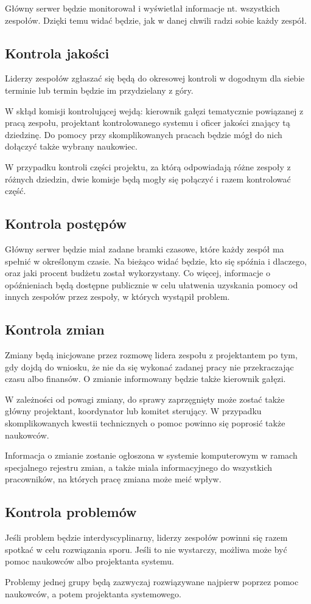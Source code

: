 Główny serwer będzie monitorował i wyświetlał informacje nt. wszystkich zespołów.
Dzięki temu widać będzie, jak w danej chwili radzi sobie każdy zespół.

\subsection{Kontrola jakości}
Liderzy zespołów zgłaszać się będą do okresowej kontroli w dogodnym dla siebie terminie lub termin będzie im przydzielany z góry.

W skłąd komisji kontrolującej wejdą: kierownik gałęzi tematycznie powiązanej z pracą zespołu, projektant kontrolowanego systemu i oficer jakości znający tą dziedzinę.
Do pomocy przy skomplikowanych pracach będzie mógł do nich dołączyć także wybrany naukowiec.

W przypadku kontroli części projektu, za którą odpowiadają różne zespoły z różnych dziedzin, dwie komisje będą mogły się połączyć i razem kontrolować część.

\subsection{Kontrola postępów}
Główny serwer będzie miał zadane bramki czasowe, które każdy zespół ma spełnić w określonym czasie. Na bieżąco widać będzie, kto się spóźnia i dlaczego, oraz jaki procent budżetu został wykorzystany.
Co więcej, informacje o opóźnieniach będą dostępne publicznie w celu ułatwenia uzyskania pomocy od innych zespołów przez zespoły, w których wystąpił problem.

\subsection{Kontrola zmian}
Zmiany będą inicjowane przez rozmowę lidera zespołu z projektantem po tym, gdy dojdą do wniosku, że nie da się wykonać zadanej pracy nie przekraczając czasu albo finansów.
O zmianie informowany będzie także kierownik gałęzi.

W zależności od powagi zmiany, do sprawy zaprzęgnięty może zostać także główny projektant, koordynator lub komitet sterujący.
W przypadku skomplikowanych kwestii technicznych o pomoc powinno się poprosić także naukowców.

Informacja o zmianie zostanie ogłoszona w systemie komputerowym w ramach specjalnego rejestru zmian, a także miala informacyjnego do wszystkich pracowników, na których pracę zmiana może meić wpływ.

\subsection{Kontrola problemów}
Jeśli problem będzie interdyscyplinarny, liderzy zespołów powinni się razem spotkać w celu rozwiązania sporu.
Jeśli to nie wystarczy, możliwa może być pomoc naukowców albo projektanta systemu.

Problemy jednej grupy będą zazwyczaj rozwiązywane najpierw poprzez pomoc naukowców, a potem projektanta systemowego.


